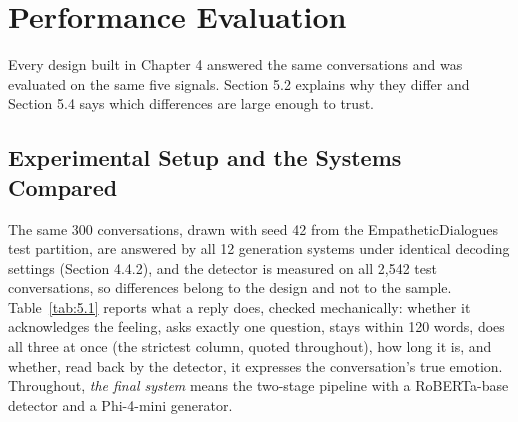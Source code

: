 \label{ch:5}

\section{Performance Evaluation}
\label{sec:5.1}

Every design built in Chapter 4 answered the same conversations and was evaluated on the same five signals. Section 5.2 explains why they differ and Section 5.4 says which differences are large enough to trust.

\subsection{Experimental Setup and the Systems Compared}
\label{sec:5.1.1}

The same 300 conversations, drawn with seed 42 from the EmpatheticDialogues test partition, are answered by all 12 generation systems under identical decoding settings (Section 4.4.2), and the detector is measured on all 2,542 test conversations, so differences belong to the design and not to the sample. Table~\ref{tab:5.1} reports what a reply does, checked mechanically: whether it acknowledges the feeling, asks exactly one question, stays within 120 words, does all three at once (the strictest column, quoted throughout), how long it is, and whether, read back by the detector, it expresses the conversation's true emotion. Throughout, \textit{the final system} means the two-stage pipeline with a RoBERTa-base detector and a Phi-4-mini generator.

